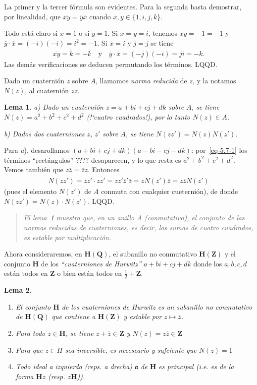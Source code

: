 \documentclass[bibtotoc,leqno,spanish]{amsbook}
\newcommand{\QQ}{\mathbf{Q}}
\newcommand{\ZZ}{\mathbf{Z}}
\newcommand{\HH}{\mathbf{H}}
\newcommand{\idl}[1]{\mathfrak{#1}}
\newcommand{\QED}{LQQD.}
\newcommand{\oline}[1]{\overline{#1}}
\numberwithin{equation}{section}
\newenvironment{comm}%
	{\begin{quotation}\itshape}
	{\end{quotation}}
\theoremstyle{note}
\theoremstyle{note}
\newtheorem{lemma}{Lema}
\theoremstyle{rem}
\numberwithin{theorem}{section}
\numberwithin{proposition}{section}
\numberwithin{definition}{section}
\numberwithin{lemma}{section}
\numberwithin{corollary}{section}
\numberwithin{example}{section}
\numberwithin{footnote}{section}%
\begin{document}
La primer y la tercer f\'ormula son evidentes. Para la segunda basta demostrar, por linealidad,
que $\oline{xy} = \oline{y}\oline x$ cuando $x,y\in\{1,i,j,k\}$.

Todo est\'a claro si $x=1$ o si $y=1$. Si $x=y=i$, tenemos $\oline{xy} = \oline{-1}=-1$ y
$\oline y\cdot\oline x = (-i)(-i) = i^{2}=-1$. Si $x=i$ y $j=j$ se tiene
\begin{gather*}
\oline{xy} = \oline k = -k\quad\text{y}\quad\oline y\cdot\oline x = (-j)(-i) = ji = -k.
\end{gather*}
Las dem\'as verificaciones se deducen permutando los t\'erminos. \QED

Dado un cuaterni\'on $z$ sobre $A$, llamamos {\em norma reducida} de $z$, y la notamos
$N(z)$, al cuaterni\'on $z\oline z$.

\begin{lemma}\label{lem5.7.2}
a) Dado un cuaterni\'on $z = a+bi+cj+dk$ sobre $A$, se tiene
$N(z) = a^{2}+b^{2}+c^{2}+d^{2}$ (!`cuatro cuadrados!), por lo tanto $N(z)\in A$.

b) Dados dos cuaterniones $z$, $z'$ sobre $A$, se tiene $N(zz') = N(z)N(z')$.
\end{lemma}

Para {\itshape a}), desarollamos $(a+bi+cj+dk)(a-bi-cj-dk)$: por~\eqref{eq-5.7-1} los t\'erminos
``rect\'angulos'' ???? desaparecen, y lo que resta es $a^{2}+b^{2}+c^{2}+d^{2}$. Vemos tambi\'en que
$z\oline z = \oline z z$. Entonces
\begin{gather*}
N(zz') = zz'\cdot\oline{zz'} = zz'\oline z'\oline z = zN(z')\oline z = z\oline zN(z')
\end{gather*}
(pues el elemento $N(z')$ de $A$ conmuta con cualquier cueterni\'on), de donde $N(zz') = N(z)\cdot N(z')$. \QED

\begin{comm}
El lema~\ref{lem5.7.2} muestra que, en un anillo $A$ (conmutativo), el conjunto de las normas reducidas de cuaterniones,
es decir, las sumas de cuatro cuadrados, es estable por multiplicaci\'on.
\end{comm}

Ahora consideraremos, en $\HH(\QQ)$, el subanillo no conmutativo $\HH(\ZZ)$ y el conjunto $\HH$ de los
{\em ``cuaterniones de Hurwitz''} $a+bi+cj+dk$ donde los $a, b, c, d$ est\'an todos en $\ZZ$ o
bien est\'an todos en $\frac{1}{2}+\ZZ$.

\begin{lemma}
\begin{enumerate}
\item El conjunto $\HH$ de los cuaterniones de Hurwitz es un subanillo no conmutativo de $\HH(\QQ)$ que
contiene a $\HH(\ZZ)$ y estable por $z\mapsto\oline z$.
\item Para todo $z\in\HH$, se tiene $z+\oline z\in\ZZ$ y $N(z) = z\oline z\in\ZZ$
\item Para que $z\in H$ sea inversible, es neceseario y sufciente que $N(z) = 1$
\item Todo ideal a izquierda (reps. a drecha) $\idl{a}$ de $\HH$ es principal (i.e. es de la forma
$\HH z$ (resp. $z\HH$)).
\end{enumerate}
\end{lemma}
\end{document}
